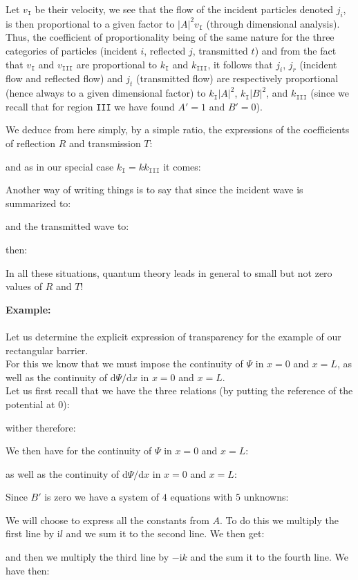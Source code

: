 	Let $v_{\texttt{I}}$ be their velocity, we see that the flow of the incident particles denoted $j_i$, is then proportional to a given factor to $|A|^2v_{\texttt{I}}$ (through dimensional analysis). Thus, the coefficient of proportionality being of the same nature for the three categories of particles (incident $i$, reflected $j$, transmitted $t$) and from the fact that $v_{\texttt{I}}$ and $v_{\texttt{III}}$ are proportional to $k_{\texttt{I}}$ and $k_{\texttt{III}}$, it follows that $j_i$, $j_r$ (incident flow and reflected flow) and $j_t$ (transmitted flow) are respectively proportional (hence always to a given dimensional factor) to $k_{\texttt{I}}|A|^2$, $k_{\texttt{I}}|B|^2$, and $k_{\texttt{III}}$ (since we recall that for region \texttt{III} we have found $A'=1$ and $B'=0$).
	
	We deduce from here simply, by a simple ratio, the expressions of the coefficients of reflection $R$ and transmission $T$:
	
	and as in our special case $k_{\texttt{I}}=kk_{\texttt{III}}$ it comes:
	
	Another way of writing things is to say that since the incident wave is summarized to:
	
	and the transmitted wave to:
	
	then:
	
	In all these situations, quantum theory leads in general to small but not zero values of $R$ and $T$!
	
	\begin{tcolorbox}[colframe=black,colback=white,sharp corners]
	\textbf{{\Large {}}Example:}\\\\
	Let us determine the explicit expression of transparency for the example of our rectangular barrier.\\ 

	For this we know that we must impose the continuity of $\Psi$ in $x=0$ and $x=L$, as well as the continuity of $\mathrm{d}\Psi/\mathrm{d}x$ in $x=0$ and $x=L$.\\

	Let us first recall that we have the three relations (by putting the reference of the potential at $0$):
	
	wither therefore:
	
	We then have for the continuity of $\Psi$ in $x=0$ and $x=L$:
	
	as well as the continuity of $\mathrm{d}\Psi/\mathrm{d}x$ in $x=0$ and $x=L$:
	
	Since $B'$ is zero we have a system of $4$ equations with $5$ unknowns:
	
	We will choose to express all the constants from $A$. To do this we multiply the first line by $\mathrm{i}l$ and we sum it to the second line. We then get:
	
	and then we multiply the third line by $-\mathrm{i}k$ and the sum it to the fourth line. We have then:
	\end{tcolorbox}
	
